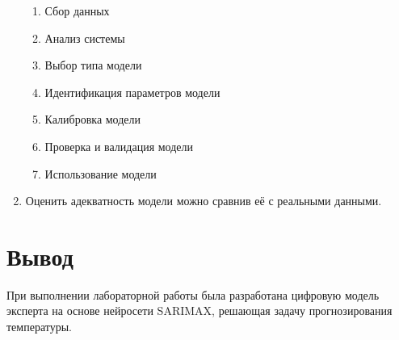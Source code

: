 \documentclass[a4paper, 12pt]{article}
\begin{document}
\begin{enumerate}
  \begin{enumerate}
    \item Сбор данных
    \item Анализ системы
    \item Выбор типа модели
    \item Идентификация параметров модели
    \item Калибровка модели
    \item Проверка и валидация модели
    \item Использование модели
  \end{enumerate}
  \item Оценить адекватность модели можно сравнив её с реальными данными.
\end{enumerate}
\newpage
\section{Вывод}
При выполнении лабораторной работы была разработана цифровую модель эксперта на основе нейросети SARIMAX, решающая задачу прогнозирования температуры. 
\end{document}
